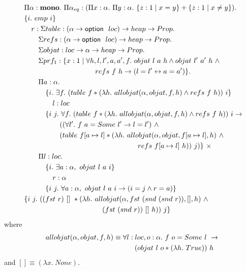 {\small\begin{align*}
&\Pi \alpha : \MONO.\ \Pi \alpha_{eq} : (\Pi x : \alpha.\ \Pi y : \alpha.\ \{ z : 1 \mid x = y \} + \{ z : 1 \mid x \neq y \}).\\
&\{ i.\ emp\ i \}\\
&\quad r : \Sigma table : (\alpha \rightarrow \opttype\ \LOC) \rightarrow \HEAP \rightarrow \PROP.\\
&\quad\quad \Sigma refs : (\alpha \rightarrow \opttype\ \LOC) \rightarrow \HEAP \rightarrow \PROP.\\
&\quad\quad \Sigma objat : \LOC \rightarrow \alpha \rightarrow \HEAP \rightarrow \PROP.\\
&\quad\quad\Sigma prf_1 : \{ x : 1 \mid \forall h, l, l', a, a', f.\ objat\ l\ a\ h \land objat\ l'\ a'\ h\ \land\\
&\quad\quad\quad\quad\quad\quad\quad\quad\quad\quad refs\ f\ h \rightarrow (l = l' \leftrightarrow a = a') \}.\\
&\quad\quad \Pi a : \alpha.\\
&\quad\quad\quad \{ i.\ \exists f.\ (table\ f * (\lambda h.\ allobjat(\alpha, objat, f, h) \land refs\ f\ h))\ i \}\\
&\quad\quad\quad\quad l : \LOC\\
&\quad\quad\quad \{ i\ j.\ \forall f.\ (table\ f * (\lambda h.\ allobjat(\alpha, objat, f, h) \land refs\ f\ h))\ i \rightarrow\\
&\quad\quad\quad\quad\quad ((\forall l'.\ f\ a = Some\ l' \rightarrow l = l')\ \land\\
&\quad\quad\quad\quad\quad (table\ f[a \mapsto l] * (\lambda h.\ allobjat(\alpha, objat, f[a \mapsto l], h)\ \land\\
&\quad\quad\quad\quad\quad\quad\quad\quad\quad\quad\quad\quad\quad\quad\quad\quad refs\ f[a \mapsto l]\ h))\ j) \}\ \times\\
&\quad\quad \Pi l : loc.\\
&\quad\quad\quad \{ i.\ \exists a : \alpha,\ objat\ l\ a\ i \}\\
&\quad\quad\quad\quad r : \alpha\\
&\quad\quad\quad \{ i\ j.\ \forall a : \alpha,\ objat\ l\ a\ i \rightarrow (i = j \land r = a) \}\\\
&\{ i\ j.\ ((fst\ r)\ []\ * (\lambda h.\ allobjat(\alpha, fst\ (snd\ (snd\ r)), [], h)\ \land\\
&\quad\quad\quad\quad\quad\quad\quad\quad\quad\quad\quad (fst\ (snd\ r))\ []\ h))\ j \}
\end{align*}}
where
\begin{align*}
allobjat(\alpha, objat, f, h) &\equiv \forall l : \LOC, o : \alpha.\ f\ o = Some\ l\ \rightarrow\\&\quad\quad\quad (objat\ l\ o * (\lambda h.\ \TRUE))\ h
\end{align*}
and $[] \equiv (\lambda x.\ None)$.

